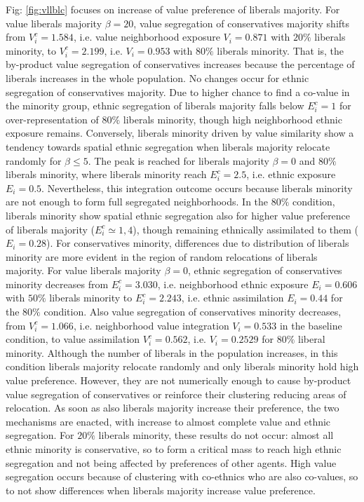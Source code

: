 \documentclass{article}
\begin{document}
Fig: \ref{fig:vllblc} focuses on increase of value preference of liberals majority. For value liberals majority $\beta = 20$, value segregation of conservatives majority shifts from $V^c_i = 1.584$, i.e. value neighborhood exposure $V_i = 0.871$ with $20 \%$ liberals minority, to $V^c_ i = 2.199$, i.e. $V_i = 0.953$ with $80 \%$ liberals minority. That is, the by-product value segregation of conservatives increases because the percentage of liberals increases in the whole population. No changes occur for ethnic segregation of conservatives majority.
Due to higher chance to find a co-value in the minority group, ethnic segregation of liberals majority falls below $E^c_i = 1$ for over-representation of $80 \%$ liberals minority, though high neighborhood ethnic exposure remains. Conversely, liberals minority driven by value similarity show a tendency towards spatial ethnic segregation when liberals majority relocate randomly for  $\beta \leq 5$. The peak is reached for liberals majority $\beta = 0$ and $80 \%$ liberals minority, where liberals minority reach $E^c_i = 2.5$, i.e. ethnic exposure $E_i = 0.5$. Nevertheless, this integration outcome occurs because liberals minority are not enough to form full segregated neighborhoods. In the $80 \%$  condition, liberals minority show spatial ethnic segregation also for higher value preference of liberals majority ($E^c_i \simeq 1,4$), though remaining ethnically assimilated to them ($E_i = 0.28$). For conservatives minority, differences due to distribution of liberals minority are more evident in the region of random relocations of liberals majority. For value liberals majority $\beta = 0$, ethnic segregation of conservatives minority decreases from $E^c_i = 3.030$, i.e. neighborhood ethnic exposure $E_i = 0.606$ with $50 \%$ liberals minority to $E^c_i = 2.243$, i.e. ethnic assimilation $E_i = 0.44$ for the $80 \%$ condition. Also value segregation of conservatives minority decreases, from $V^c_i = 1.066$, i.e. neighborhood value integration $V_i = 0.533$ in the baseline condition, to value assimilation $V^c_i = 0.562$, i.e. $V_i = 0.2529$ for $80 \%$ liberal minority. Although the number of liberals in the population increases, in this condition liberals majority relocate randomly and only liberals minority hold high value preference. However, they are not numerically enough to cause by-product value segregation of conservatives or reinforce their clustering reducing areas of relocation. As soon as also liberals majority increase their preference, the two mechanisms are enacted, with increase to almost complete value and ethnic segregation. For $20 \%$ liberals minority, these results do not occur: almost all ethnic minority is conservative, so to form a critical mass to reach high ethnic segregation and not being affected by preferences of other agents. High value segregation occurs because of clustering with co-ethnics who are also co-values, so to not show differences when liberals majority increase value preference. 
\end{document}
